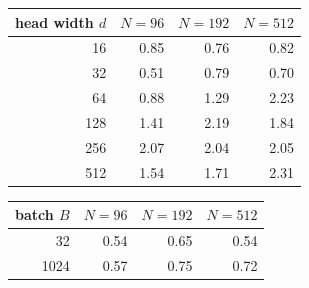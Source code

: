 \begin{tabular}{rrrr}
\toprule
head width $d$ & $N{=}96$ & $N{=}192$ & $N{=}512$ \\
\midrule
16 & 0.85 & 0.76 & 0.82 \\
32 & 0.51 & 0.79 & 0.70 \\
64 & 0.88 & 1.29 & 2.23 \\
128 & 1.41 & 2.19 & 1.84 \\
256 & 2.07 & 2.04 & 2.05 \\
512 & 1.54 & 1.71 & 2.31 \\
\bottomrule
\end{tabular}

\vspace{1em}

\begin{tabular}{rrrr}
\toprule
batch $B$ & $N{=}96$ & $N{=}192$ & $N{=}512$ \\
\midrule
32 & 0.54 & 0.65 & 0.54 \\
1024 & 0.57 & 0.75 & 0.72 \\
\bottomrule
\end{tabular}%
